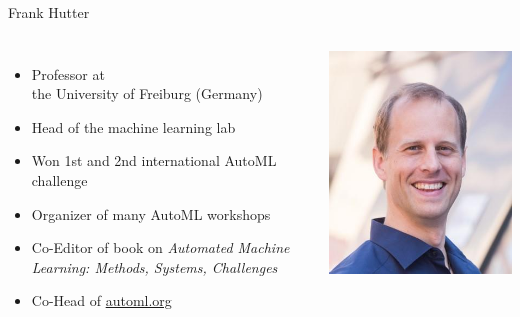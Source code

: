 \begin{frame}[c]{Frank Hutter}

\begin{columns}
	

\begin{itemize}
	\item Professor at\\ the University of Freiburg (Germany)
	\item Head of the machine learning lab
	\item Won 1st and 2nd international AutoML challenge
	\item Organizer of many AutoML workshops 
	\item Co-Editor of book on \textit{Automated Machine Learning:	Methods, Systems, Challenges}
	\item Co-Head of \url{automl.org}
	
\end{itemize}


\includegraphics[width=1.0\textwidth]{images/hutter.jpg}
	
\end{columns}

\end{frame}

